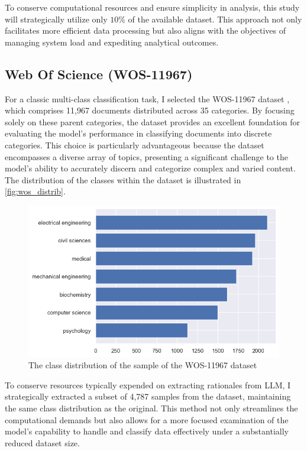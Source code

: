 To conserve computational resources and ensure simplicity in analysis, this study will strategically utilize only $10\%$ of the available dataset. This approach not only facilitates more efficient data processing but also aligns with the objectives of managing system load and expediting analytical outcomes.

\subsection{Web Of Science (WOS-11967)}
\label{sec:wos}

For a classic multi-class classification task, I selected the WOS-11967 dataset \cite{wos}, which comprises 11,967 documents distributed across 35 categories. By focusing solely on these parent categories, the dataset provides an excellent foundation for evaluating the model's performance in classifying documents into discrete categories. This choice is particularly advantageous because the dataset encompasses a diverse array of topics, presenting a significant challenge to the model's ability to accurately discern and categorize complex and varied content. The distribution of the classes within the dataset is illustrated in \autoref{fig:wos_distrib}.

\begin{figure}[hbt]
    \centering
    \includegraphics[width=0.8\linewidth]{figs/wos_distrib.png}
    \caption{The class distribution of the sample of the WOS-11967 dataset}
    \label{fig:wos_distrib}
\end{figure}

To conserve resources typically expended on extracting rationales from LLM, I strategically extracted a subset of 4,787 samples from the dataset, maintaining the same class distribution as the original. This method not only streamlines the computational demands but also allows for a more focused examination of the model's capability to handle and classify data effectively under a substantially reduced dataset size.

